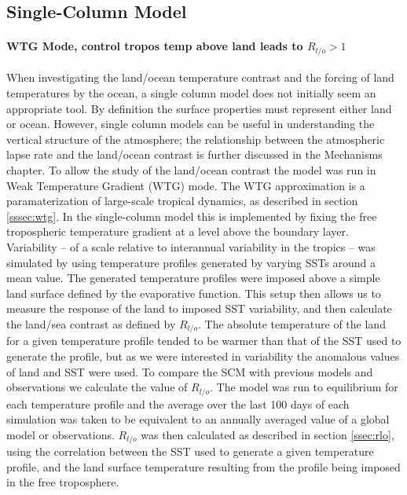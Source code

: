 \subsection{Single-Column Model}

\paragraph{WTG Mode, control tropos temp above land leads to $R_{l/o}>1$}
When investigating the land/ocean temperature contrast and the forcing of land 
temperatures by the ocean, a single column model does not initially seem an 
appropriate tool. By definition the surface properties must represent either 
land or ocean.  However, single column models can be useful in understanding the 
vertical structure of the atmosphere; the relationship between the atmospheric 
lapse rate and the land/ocean contrast is further discussed in the Mechanisms 
chapter. To allow the study of the land/ocean contrast the model was run in Weak 
Temperature Gradient (WTG) mode. The WTG approximation is a paramaterization of 
large-scale tropical dynamics, as described in section \ref{sssec:wtg}. In the 
single-column model this is implemented by fixing the free tropospheric 
temperature gradient at a level above the boundary layer. Variability -- of a 
scale relative to interannual variability in the tropics -- was simulated by 
using temperature profiles generated by varying SSTs around a mean value. The 
generated temperature profiles were imposed above a simple land surface defined 
by the evaporative function. This setup then allows us to measure the response 
of the land to imposed SST variability, and then calculate the land/sea contrast 
as defined by $R_{l/o}$. The absolute temperature of the land for a given 
temperature profile tended to be warmer than that of the SST used to generate 
the profile, but as we were interested in variability the anomalous values of 
land and SST were used. To compare the SCM with previous models and observations 
we calculate the value of $R_{l/o}$. The model was run to equilibrium for each 
temperature profile and the average over the last 100 days of each simulation 
was taken to be equivalent to an annually averaged value of a global model or 
observations. $R_{l/o}$ was then calculated as described in section 
\ref{ssec:rlo}, using the correlation between the SST used to generate a given 
temperature profile, and the land surface temperature resulting from the profile 
being imposed in the free troposphere. 

